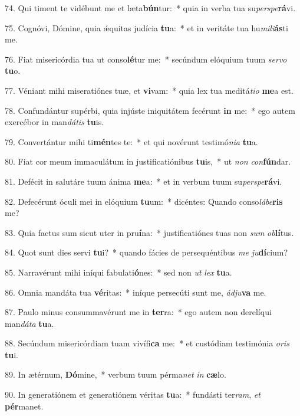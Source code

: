 74. Qui timent te vidébunt me et læta\textbf{bún}tur:~*  quia in verba tua su\textit{per}\textit{spe}\textbf{rá}vi.\

75. Cognóvi, Dómine, quia ǽquitas judícia \textbf{tu}a:~*  et in veritáte tua hu\textit{mi}\textit{li}\textbf{ás}ti me.\

76. Fiat misericórdia tua ut conso\textbf{lé}tur me:~*  secúndum elóquium tuum \textit{ser}\textit{vo} \textbf{tu}o.\

77. Véniant mihi miseratiónes tuæ, et \textbf{vi}vam:~*  quia lex tua meditá\textit{ti}\textit{o} \textbf{me}a est.\

78. Confundántur supérbi, quia injúste iniquitátem fecérunt \textbf{in} me:~*  ego autem exercébor in man\textit{dá}\textit{tis} \textbf{tu}is.\

79. Convertántur mihi ti\textbf{mén}tes te:~*  et qui novérunt testimó\textit{ni}\textit{a} \textbf{tu}a.\

80. Fiat cor meum immaculátum in justificatiónibus \textbf{tu}is,~*  ut \textit{non} \textit{con}\textbf{fún}dar.\

81. Defécit in salutáre tuum ánima \textbf{me}a:~*  et in verbum tuum su\textit{per}\textit{spe}\textbf{rá}vi.\

82. Defecérunt óculi mei in elóquium \textbf{tu}um:~*  dicéntes: Quando conso\textit{lá}\textit{be}\textbf{ris} me?\

83. Quia factus sum sicut uter in pru\textbf{í}na:~*  justificatiónes tuas non \textit{sum} \textit{ob}\textbf{lí}tus.\

84. Quot sunt dies servi \textbf{tu}i?~*  quando fácies de persequéntibus \textit{me} \textit{ju}\textbf{dí}cium?\

85. Narravérunt mihi iníqui fabulati\textbf{ó}nes:~*  sed non \textit{ut} \textit{lex} \textbf{tu}a.\

86. Omnia mandáta tua \textbf{vé}ritas:~*  iníque persecúti sunt me, \textit{ád}\textit{ju}\textbf{va} me.\

87. Paulo minus consummavérunt me in \textbf{ter}ra:~*  ego autem non derelíqui man\textit{dá}\textit{ta} \textbf{tu}a.\

88. Secúndum misericórdiam tuam vivífi\textbf{ca} me:~*  et custódiam testimónia \textit{o}\textit{ris} \textbf{tu}i.\

89. In ætérnum, \textbf{Dó}mine,~*  verbum tuum pérma\textit{net} \textit{in} \textbf{cæ}lo.\

90. In generatiónem et generatiónem véritas \textbf{tu}a:~*  fundásti ter\textit{ram}, \textit{et} \textbf{pér}manet.\

